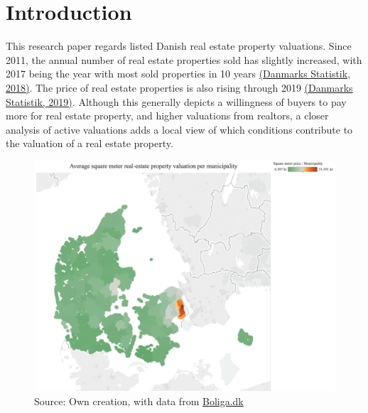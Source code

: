 \documentclass[12pt,a4paper]{article}
\begin{document}

\newpage
\onehalfspacing

\tableofcontents
\newpage
\section{Introduction}
This research paper regards listed Danish real estate property valuations. Since 2011, the annual number of real estate properties sold has slightly increased, with 2017 being the year with most sold properties in 10 years \href{https://www.dst.dk/da/Statistik/nyt/NytHtml?cid=27979}{(Danmarks Statistik, 2018)}. The price of real estate properties is also rising through 2019 \href{https://www.dst.dk/da/Statistik/nyt/NytHtml?cid=28741}{(Danmarks Statistik, 2019)}. Although this generally depicts a willingness of buyers to pay more for real estate property, and higher valuations from realtors, a closer analysis of active valuations adds a local view of which conditions contribute to the valuation of a real estate property. \newline
\newcommand{\source}[1]{\caption*{Source: {#1}} }\begin{figure}[H]
\centering
\caption{}
\includegraphics[scale=0.4]{123.png}
\source{Own creation, with data from \href{https://www.boliga.dk}{Boliga.dk}}
\end{figure}
\end{document}
